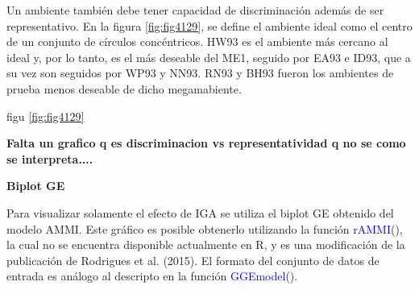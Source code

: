 Un ambiente también debe tener capacidad de discriminación además de ser representativo. En la figura \ref{fig:fig4129}, se define el ambiente ideal como el centro de un conjunto de círculos concéntricos. HW93 es el ambiente más cercano al ideal y, por lo tanto, es el más deseable del ME1, seguido por EA93 e ID93, que a su vez son seguidos por WP93 y NN93. RN93 y BH93 fueron los ambientes de prueba menos deseable de dicho megamabiente.


figu \ref{fig:fig4129}



\textbf{Falta un grafico q es discriminacion vs representatividad q no se como se interpreta....}

\textbf{Biplot GE}

Para visualizar solamente el efecto de IGA se utiliza el biplot GE obtenido del modelo AMMI. Este gráfico es posible obtenerlo utilizando la función \textcolor{blue}{rAMMI}(), la cual no se encuentra disponible actualmente en R, y es una modificación de la publicación de Rodrigues et al. (2015). El formato del conjunto de datos de entrada es análogo al descripto en la función \textcolor{blue}{GGEmodel}(). 

